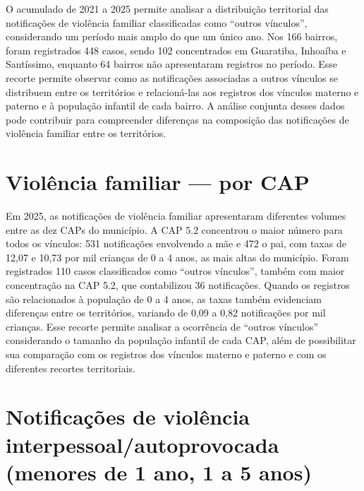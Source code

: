 
O acumulado de 2021 a 2025 permite analisar a distribuição territorial das notificações de violência familiar classificadas como “outros vínculos”, considerando um período mais amplo do que um único ano. Nos 166 bairros, foram registrados 448 casos, sendo 102 concentrados em Guaratiba, Inhoaíba e Santíssimo, enquanto 64 bairros não apresentaram registros no período. Esse recorte permite observar como as notificações associadas a outros vínculos se distribuem entre os territórios e relacioná-las aos registros dos vínculos materno e paterno e à população infantil de cada bairro. A análise conjunta desses dados pode contribuir para compreender diferenças na composição das notificações de violência familiar entre os territórios.


\section{Violência familiar — por CAP}



Em 2025, as notificações de violência familiar apresentaram diferentes volumes entre as dez CAPs do município. A CAP 5.2 concentrou o maior número para todos os vínculos: 531 notificações envolvendo a mãe e 472 o pai, com taxas de 12,07 e 10,73 por mil crianças de 0 a 4 anos, as mais altas do município. Foram registrados 110 casos classificados como “outros vínculos”, também com maior concentração na CAP 5.2, que contabilizou 36 notificações. Quando os registros são relacionados à população de 0 a 4 anos, as taxas também evidenciam diferenças entre os territórios, variando de 0,09 a 0,82 notificações por mil crianças. Esse recorte permite analisar a ocorrência de “outros vínculos” considerando o tamanho da população infantil de cada CAP, além de possibilitar sua comparação com os registros dos vínculos materno e paterno e com os diferentes recortes territoriais.

\section{Notificações de violência interpessoal/\allowbreak{}autoprovocada (menores de 1 ano, 1 a 5 anos)}

